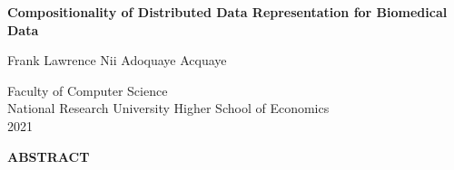 \begin{center}

\vfill

{\large\bf Compositionality of Distributed Data Representation for Biomedical Data}

\vspace{5mm}

Frank Lawrence Nii Adoquaye Acquaye

{\singlespacing
Faculty of Computer Science\\
National Research University Higher School of Economics\\
2021\\
}

\vspace{5mm}

{\large\bf ABSTRACT}
\end{center}

